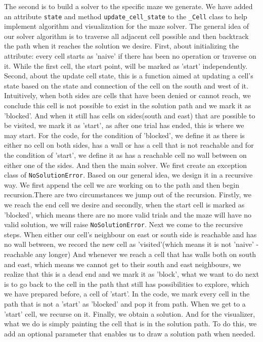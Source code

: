 \documentclass[fontsize=11pt]{article}
\begin{document}
The second is to build a solver to the specific maze we generate. We have added an attribute \texttt{state} and method \texttt{update\_cell\_state} to the \texttt{\_Cell} class to help implement algorithm and visualization for the maze solver. The general idea of our solver algorithm is to traverse all adjacent cell possible and then backtrack the path when it reaches the solution we desire.
First, about initializing the attribute: every cell starts as 'naive' if there has been no operation or traverse on it. While the first cell, the start point, will be marked as 'start' independently.
Second, about the update cell state, this is a function aimed at updating a cell's state based on the state and connection of the cell on the south and west of it. Intuitively, when  both sides are cells that have been denied or cannot reach, we conclude this cell is not possible to exist in the solution path and we mark it as 'blocked'. And when it still has cells on sides(south and east) that are possible to be visited, we mark it as 'start', as after one trial has ended, this is where we may start. For the code, for the condition of 'blocked', we define it as there is either no cell on both sides, has a wall or has a cell that is not reachable and for the condition of 'start', we define it as has a reachable cell no wall between on either one of the sides.
And then the main solver. We first create an exception class of \texttt{NoSolutionError}. Based on our general idea, we design it in a recursive way.  We first append the cell we are working on to the path and then begin recursion.There are two circumstances we jump out of the recursion. Firstly, we we reach the end cell we desire and secondly, when the start cell is marked as 'blocked', which means there are no more valid trials and the maze will have no valid solution, we will raise \texttt{NoSolutionError}. Next we come to the recursive steps. When either our cell's neighbour on east or south side is reachable and has no wall between, we record the new cell as 'visited'(which means it is not 'naive' - reachable any longer)
And whenever we reach a cell that has walls both on south and east, which means we cannot get to their south and east neighbours, we realize that this is a dead end and we mark it as 'block', what we want to do next is to go back to the cell in the path that still has possibilities to explore, which we have prepared before, a cell of 'start'. In the code, we mark every cell in the path that is not a 'start'  as 'blocked' and pop it from path. When we get to a 'start' cell, we recurse on it. Finally, we obtain a solution. And for the visualizer, what we do is simply painting the cell that is in the solution path. To do this, we add an optional parameter that enables us to draw a solution path when needed.
\end{document}
